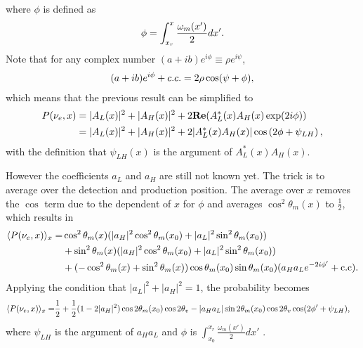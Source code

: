\documentclass[letterpaper,12pt,english]{sphinxmanual}
\begin{document}
where \(\phi\) is defined as
\begin{gather}
\begin{split}\phi = \int_{x_r}^{x} \frac{\omega_m(x')}{2}dx'.\end{split}\notag
\end{gather}
Note that for any complex number \((a+ib)e^{i\phi} \equiv \rho e^{i\psi}\),
\begin{gather}
\begin{split}(a+ib)e^{i\phi} + c.c.=2 \rho \cos(\psi+\phi),\end{split}\notag
\end{gather}
which means that the previous result can be simplified to
\begin{gather}
\begin{split}P(\nu_e,x) &=  \lvert A_L(x) \rvert^2 + \lvert A_H(x) \rvert^2 + 2 \mathbf{Re}( A_L^*(x) A_H(x) \exp(2i\phi) ) \\
& =  \lvert A_L(x) \rvert^2 + \lvert A_H(x) \rvert^2 + 2 \lvert A_L^*(x) A_H(x) \rvert \cos\left( 2\phi + \psi_{LH} \right),\end{split}\notag
\end{gather}
with the definition that \(\psi_{LH}(x)\) is the argument of \(A_L^*(x)A_H(x)\).

However the coefficients \(a_L\) and \(a_H\) are still not known yet. The trick is to average over the detection and production position. The average over \(x\) removes the \(\cos\) term due to the dependent of \(x\) for \(\phi\) and averages \(\cos^2\theta_m(x)\) to \(\frac{1}{2}\), which results in
\begin{gather}
\begin{split}\langle P(\nu_e,x)\rangle_{x} =& \cos^2\theta_m(x) (\lvert a_H\rvert^2 \cos^2\theta_m(x_0) + \lvert a_L\rvert^2 \sin^2\theta_m(x_0) ) \\
& + \sin^2\theta_m(x) ( \lvert a_H\rvert^2 \cos^2\theta_m(x_0) + \lvert a_L \rvert^2 \sin^2\theta_m(x_0) ) \\
& + ( - \cos^2\theta_m(x) + \sin^2\theta_m(x) ) \cos\theta_m(x_0)\sin\theta_m(x_0) ( a_H a_L e^{-2i\phi'} + \mathrm{c.c}) .\end{split}\notag
\end{gather}
Applying the condition that \(\lvert a_L \rvert^2 + \lvert a_H \rvert^2 = 1\), the probability becomes
\begin{gather}
\begin{split}\langle P(\nu_e,x)\rangle_{x} =& \frac{1}{2} + \frac{1}{2} (1 - 2 \lvert a_H \rvert^2) \cos 2\theta_m(x_0) \cos 2\theta_v - \lvert a_H a_L \rvert \sin 2\theta_m(x_0)\cos 2\theta_v \cos ( 2 \phi' + \psi_{LH} ),\end{split}\notag
\end{gather}
where \(\psi_{LH}\) is the argument of \(a_H a_L\) and \(\phi\) is \(\int_{x_0}^{x_r} \frac{\omega_m(x')}{2}dx'\) .
\end{document}
